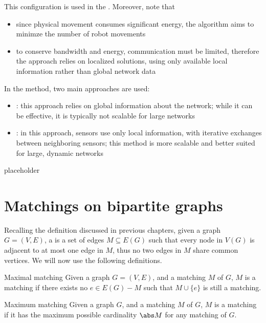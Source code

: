 \documentclass[a4paper, 12pt]{report}
\begin{document}
    This configuration is used in the . Moreover, note that

    \begin{itemize}
        \item since physical movement consumes significant energy, the algorithm aims to minimze the number of robot movements
        \item to conserve bandwidth and energy, communication must be limited, therefore the approach relies on localized solutions, using only available local information rather than global network data
    \end{itemize}

    In the  method, two main approaches are used:

    \begin{itemize}
        \item {}: this approach relies on global information about the network; while it can be effective, it is typically not scalable for large networks
        \item {}: in this approach, sensors use only local information, with iterative exchanges between neighboring sensors; this method is more scalable and better suited for large, dynamic networks
    \end{itemize}

    placeholder 

    \section{Matchings on bipartite graphs}

    Recalling the definition discussed in previous chapters, given a graph $G = (V, E)$, a  is a set of edges $M \subseteq E(G)$ such that every node in $V(G)$ is adjacent to at most one edge in $M$, thus no two edges in $M$ share common vertices. We will now use the following definitions.

    \begin{frameddefn}{Maximal matching}
        Given a graph $G = (V, E)$, and a matching $M$ of $G$, $M$ is a  matching if there exists no $e \in E(G) - M$ such that $M \cup \{e\}$ is still a matching.
    \end{frameddefn}

    \begin{frameddefn}{Maximum matching}
        Given a graph $G$, and a matching $M$ of $G$, $M$ is a  matching if it has the maximum possible cardinality $\abs M$ for any matching of $G$.
    \end{frameddefn}
\end{document}

